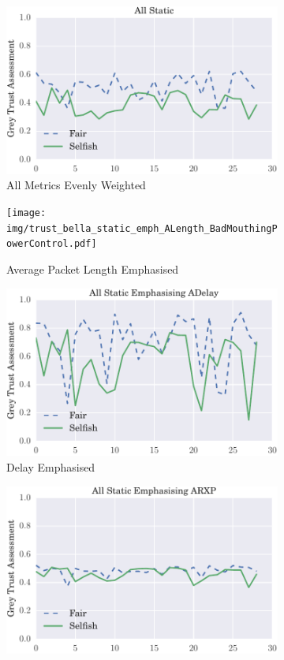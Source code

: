 \documentclass[runningheads,a4paper]{llncs}
\begin{document}
{{\begin{figure}
\begin{subfigure}{0.5\textwidth}
  \centering
  \includegraphics[width=.8\linewidth]{img/trust_bella_static_even_BadMouthingPowerControl.pdf}
  \caption{All Metrics Evenly Weighted}
  \label{fig:beta_trust_static}
\end{subfigure}
\begin{subfigure}{0.5\textwidth}
  \centering
  \texttt{[image: img/trust\_bella\_static\_emph\_ALength\_BadMouthingPowerControl.pdf]}
  \caption{Average Packet Length Emphasised}
  \label{fig:beta_trust_single}
\end{subfigure}
\begin{subfigure}{0.5\textwidth}
  \centering
  \includegraphics[width=.8\linewidth]{img/trust_bella_static_emph_ADelay_BadMouthingPowerControl.pdf}
  \caption{Delay Emphasised}
  \label{fig:beta_trust_single}
\end{subfigure}
\begin{subfigure}{0.5\textwidth}
\centering
  \includegraphics[width=.8\linewidth]{img/trust_bella_static_emph_ARXP_BadMouthingPowerControl.pdf}

\end{subfigure}
\end{figure}}}
\end{document}
